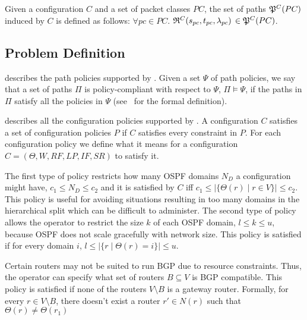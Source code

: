 \begin{definition}
Given a configuration $C$ and a set of packet classes $PC$, the set of paths
$\mathfrak{P}^C(PC)$ induced by $C$ is defined as follows: 
$\forall pc \in PC.$ $\mathfrak{R}^C(s_{pc}, t_{pc}, \lambda_{pc})$ $\in \mathfrak{P}^C(PC)$.
\end{definition}

\subsection{Problem Definition}



 describes the path policies supported by \name.
Given  a set $\Psi$ of
path policies, we say that
a set of paths $\Pi$ is policy-compliant with respect to $\Psi$, $\Pi \models \Psi$,
if the paths in $\Pi$ satisfy all the policies in $\Psi$ (see~\cite{genesis} for the formal definition). 


 describes all the configuration policies supported by \name.
A configuration $C$ satisfies a set of configuration policies $P$
if $C$ satisfies every constraint in $P$.
For each configuration policy 
we define what it means for  a configuration $C=(\Theta,W,RF,LP,IF,SR)$ to satisfy it.

The first type of policy restricts how many OSPF domains $N_D$ a
configuration might have, $c_1\leq N_D\leq c_2$ 
and it is satisfied by $C$ iff $c_1\leq |\{\Theta(r)\mid r\in V\}|\leq
c_2$.  This policy is useful for avoiding situations resulting in too
many domains in the hierarchical split which can be difficult to
administer.  The second type of policy allows the operator to restrict
the size $k$ of each OSPF domain, $l\leq k\leq u$, because OSPF does
not scale gracefully with network size.  This policy is satisfied if
for every domain $i$, $l\leq |\{r \mid \Theta(r)=i\}|\leq u$.


Certain 
	routers may not be suited to run BGP due to resource
	constraints. Thus, the operator can specify what set of 
	routers $B\subseteq V$ is BGP compatible.  
	This policy is satisfied if none of the routers $V\setminus B$
	is a gateway router.
	Formally, for every $r\in V\setminus B$,
	there doesn't exist a router $r'\in N(r)$ such that $\Theta(r) \not= \Theta(r_1)$

